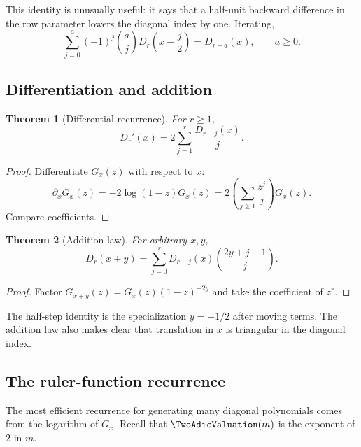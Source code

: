 \documentclass[11pt,oneside]{article}
\numberwithin{equation}{section}
\newtheorem{theorem}{Theorem}[section]
\theoremstyle{definition}
\theoremstyle{remark}
\begin{document}
This identity is unusually useful: it says that a half-unit backward
difference in the row parameter lowers the diagonal index by one.  Iterating,
\begin{equation}
 \sum_{j=0}^{a}(-1)^j\binom aj
 D_r\!\left(x-\frac j2\right)
 =D_{r-a}(x),
 \qquad a\ge0.
 \label{p3:a:eq:iterated-half-step}
\end{equation}

\subsection{Differentiation and addition}

\begin{theorem}[Differential recurrence]
For \(r\ge1\),
\begin{equation}
 \boxed{
 D_r'(x)=2\sum_{j=1}^{r}\frac{D_{r-j}(x)}{j}.}
 \label{p3:a:eq:differential-recurrence}
\end{equation}
\end{theorem}

\begin{proof}
Differentiate \(G_x(z)\) with respect to \(x\):
\[
 \partial_xG_x(z)=-2\log(1-z)G_x(z)
 =2\left(\sum_{j\ge1}\frac{z^j}{j}\right)G_x(z).
\]
Compare coefficients.
\end{proof}

\begin{theorem}[Addition law]
For arbitrary \(x,y\),
\begin{equation}
 \boxed{
 D_r(x+y)=\sum_{j=0}^{r}
 D_{r-j}(x)\binom{2y+j-1}{j}.}
 \label{p3:a:eq:addition-law}
\end{equation}
\end{theorem}

\begin{proof}
Factor \(G_{x+y}(z)=G_x(z)(1-z)^{-2y}\) and take the coefficient of \(z^r\).
\end{proof}

The half-step identity is the specialization \(y=-1/2\) after moving terms.
The addition law also makes clear that translation in \(x\) is triangular in
the diagonal index.

\subsection{The ruler-function recurrence}

The most efficient recurrence for generating many diagonal polynomials comes
from the logarithm of \(G_x\).  Recall that \(\TwoAdicValuation(m)\) is the exponent of
\(2\) in \(m\).
\end{document}
